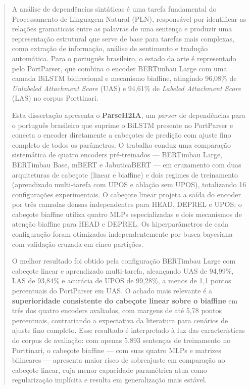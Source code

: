 \begin{abstract}

A análise de dependências sintáticas é uma tarefa fundamental do Processamento de Linguagem
Natural (PLN), responsável por identificar as relações gramaticais entre as palavras de uma
sentença e produzir uma representação estrutural que serve de base para tarefas mais complexas,
como extração de informação, análise de sentimento e tradução automática. Para o português
brasileiro, o estado da arte é representado pelo PortParser, que combina o encoder BERTimbau
Large com uma camada BiLSTM bidirecional e mecanismo biaffine, atingindo 96,08\% de
\textit{Unlabeled Attachment Score} (UAS) e 94,61\% de \textit{Labeled Attachment Score}
(LAS) no corpus Porttinari.

Esta dissertação apresenta o \textbf{ParseH2IA}, um \textit{parser} de dependências para o
português brasileiro que suprime o BiLSTM presente no PortParser e conecta o encoder
diretamente a cabeçotes de predição com ajuste fino completo de todos os parâmetros.
O trabalho conduz uma comparação sistemática de quatro encoders pré-treinados --- BERTimbau
Large, BERTimbau Base, mBERT e JabuticaBERT --- em cruzamento com duas arquiteturas de
cabeçote (linear e biaffine) e dois regimes de treinamento (aprendizado multi-tarefa com UPOS
e ablação sem UPOS), totalizando 16 configurações experimentais. O cabeçote linear projeta
a saída do encoder por três camadas densas independentes para HEAD, DEPREL e UPOS; o cabeçote
biaffine utiliza quatro MLPs especializadas e dois mecanismos de atenção biaffine para HEAD e
DEPREL. Os hiperparâmetros de cada configuração foram otimizados independentemente por busca
bayesiana com validação cruzada em cinco partições.

O melhor resultado foi obtido pela configuração BERTimbau Large com cabeçote linear e
aprendizado multi-tarefa, alcançando UAS de 94,99\%, LAS de 93,84\% e acurácia de UPOS de
99,28\%, a menos de 1,1 pontos percentuais do PortParser em UAS. O achado mais relevante é a
\textbf{superioridade consistente do cabeçote linear sobre o biaffine} em três dos quatro
encoders avaliados, com margens de até 5,78 pontos percentuais, contrariando a expectativa da
literatura para cenários de ajuste fino completo. Esse resultado é interpretado à luz das
características do corpus de avaliação: com apenas 5.893 sentenças de treinamento no
Porttinari, o cabeçote biaffine --- com suas quatro MLPs e matrizes bilineares --- apresenta
maior risco de sobreajuste em comparação ao cabeçote linear, cuja menor capacidade paramétrica
atua como regularização implícita e resulta em generalização mais estável.


\end{abstract}
